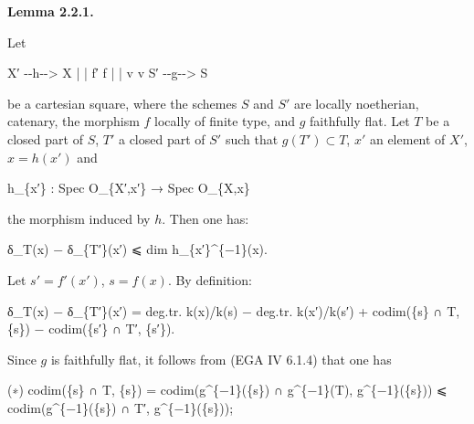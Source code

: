 \documentclass[
]{article}
\newenvironment{Shaded}{}{}
\newcommand{\NormalTok}[1]{#1}
\begin{document}
\textbf{Lemma 2.2.1.}

Let

\begin{Shaded}
\begin{Highlighting}[]
\NormalTok{X′ {-}{-}h{-}{-}\textgreater{} X}
\NormalTok{|         |}
\NormalTok{f′        f}
\NormalTok{|         |}
\NormalTok{v         v}
\NormalTok{S′ {-}{-}g{-}{-}\textgreater{} S}
\end{Highlighting}
\end{Shaded}

be a cartesian square, where the schemes \(S\) and \(S'\) are locally
noetherian, catenary, the morphism \(f\) locally of finite type, and
\(g\) faithfully flat. Let \(T\) be a closed part of \(S\), \(T'\) a
closed part of \(S'\) such that \(g(T') \subset T\), \(x'\) an element
of \(X'\), \(x = h(x')\) and

\begin{Shaded}
\begin{Highlighting}[]
\NormalTok{h\_\{x′\} : Spec O\_\{X′,x′\} → Spec O\_\{X,x\}}
\end{Highlighting}
\end{Shaded}

the morphism induced by \(h\). Then one has:

\begin{Shaded}
\begin{Highlighting}[]
\NormalTok{δ\_T(x) − δ\_\{T′\}(x′) ⩽ dim h\_\{x′\}\^{}\{−1\}(x).}
\end{Highlighting}
\end{Shaded}

Let \(s' = f'(x')\), \(s = f(x)\). By definition:

\begin{Shaded}
\begin{Highlighting}[]
\NormalTok{δ\_T(x) − δ\_\{T′\}(x′) = deg.tr. k(x)/k(s) − deg.tr. k(x′)/k(s′)}
\NormalTok{                     + codim(\{s\} ∩ T, \{s\}) − codim(\{s′\} ∩ T′, \{s′\}).}
\end{Highlighting}
\end{Shaded}

Since \(g\) is faithfully flat, it follows from (EGA IV 6.1.4) that one
has

\begin{Shaded}
\begin{Highlighting}[]
\NormalTok{(∗) codim(\{s\} ∩ T, \{s\}) = codim(g\^{}\{−1\}(\{s\}) ∩ g\^{}\{−1\}(T), g\^{}\{−1\}(\{s\}))}
\NormalTok{                       ⩽ codim(g\^{}\{−1\}(\{s\}) ∩ T′, g\^{}\{−1\}(\{s\}));}
\end{Highlighting}
\end{Shaded}
\end{document}
